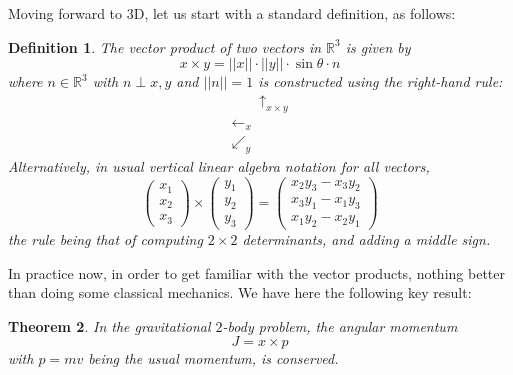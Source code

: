 \documentclass[12pt]{amsbook}
\newtheorem{theorem}{Theorem}[chapter]
\newtheorem{definition}[theorem]{Definition}
\begin{document}
Moving forward to 3D, let us start with a standard definition, as follows:

\begin{definition}
The vector product of two vectors in $\mathbb R^3$ is given by
$$x\times y=||x||\cdot||y||\cdot\sin\theta\cdot n$$
where $n\in\mathbb R^3$ with $n\perp x,y$ and $||n||=1$ is constructed using the right-hand rule:
$$\begin{matrix}
\ \ \ \ \ \ \ \ \ \uparrow_{x\times y}\\
\leftarrow_x\\
\swarrow_y
\end{matrix}$$
Alternatively, in usual vertical linear algebra notation for all vectors,
$$\begin{pmatrix}x_1\\ x_2\\x_3\end{pmatrix}
\times\begin{pmatrix}y_1\\ y_2\\y_3\end{pmatrix}
=\begin{pmatrix}x_2y_3-x_3y_2\\ x_3y_1-x_1y_3\\x_1y_2-x_2y_1\end{pmatrix}$$
the rule being that of computing $2\times2$ determinants, and adding a middle sign.
\end{definition}

In practice now, in order to get familiar with the vector products, nothing better than doing some classical mechanics. We have here the following key result:

\begin{theorem}
In the gravitational $2$-body problem, the angular momentum
$$J=x\times p$$
with $p=mv$ being the usual momentum, is conserved.
\end{theorem}
\end{document}
